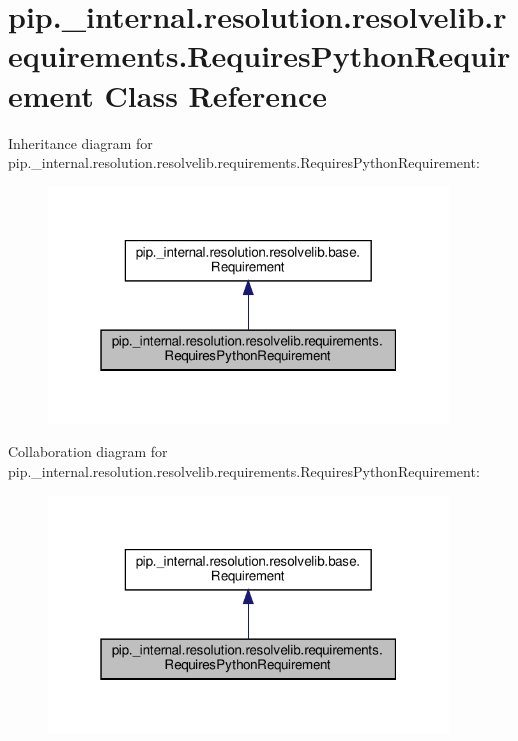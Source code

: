 \hypertarget{classpip_1_1__internal_1_1resolution_1_1resolvelib_1_1requirements_1_1RequiresPythonRequirement}{}\section{pip.\+\_\+internal.\+resolution.\+resolvelib.\+requirements.\+Requires\+Python\+Requirement Class Reference}
\label{classpip_1_1__internal_1_1resolution_1_1resolvelib_1_1requirements_1_1RequiresPythonRequirement}


Inheritance diagram for pip.\+\_\+internal.\+resolution.\+resolvelib.\+requirements.\+Requires\+Python\+Requirement\+:
\nopagebreak
\begin{figure}[H]
\begin{center}
\leavevmode
\includegraphics[width=301pt]{classpip_1_1__internal_1_1resolution_1_1resolvelib_1_1requirements_1_1RequiresPythonRequirement__inherit__graph}
\end{center}
\end{figure}


Collaboration diagram for pip.\+\_\+internal.\+resolution.\+resolvelib.\+requirements.\+Requires\+Python\+Requirement\+:
\nopagebreak
\begin{figure}[H]
\begin{center}
\leavevmode
\includegraphics[width=301pt]{classpip_1_1__internal_1_1resolution_1_1resolvelib_1_1requirements_1_1RequiresPythonRequirement__coll__graph}
\end{center}
\end{figure}
